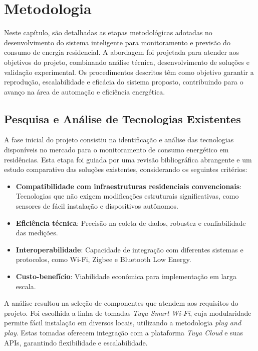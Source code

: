 \chapter{Metodologia}

Neste capítulo, são detalhadas as etapas metodológicas adotadas no desenvolvimento do sistema inteligente para monitoramento e previsão do consumo de energia residencial. A abordagem foi projetada para atender aos objetivos do projeto, combinando análise técnica, desenvolvimento de soluções e validação experimental. Os procedimentos descritos têm como objetivo garantir a reprodução, escalabilidade e eficácia do sistema proposto, contribuindo para o avanço na área de automação e eficiência energética.

\section{Pesquisa e Análise de Tecnologias Existentes}

A fase inicial do projeto consistiu na identificação e análise das tecnologias disponíveis no mercado para o monitoramento de consumo energético em residências. Esta etapa foi guiada por uma revisão bibliográfica abrangente e um estudo comparativo das soluções existentes, considerando os seguintes critérios:

\begin{itemize}
    \item \textbf{Compatibilidade com infraestruturas residenciais convencionais}: Tecnologias que não exigem modificações estruturais significativas, como sensores de fácil instalação e dispositivos autônomos.
    \item \textbf{Eficiência técnica}: Precisão na coleta de dados, robustez e confiabilidade das medições.
    \item \textbf{Interoperabilidade}: Capacidade de integração com diferentes sistemas e protocolos, como Wi-Fi, Zigbee e Bluetooth Low Energy.
    \item \textbf{Custo-benefício}: Viabilidade econômica para implementação em larga escala.
\end{itemize}

A análise resultou na seleção de componentes que atendem aos requisitos do projeto. Foi escolhida a linha de tomadas \textit{Tuya Smart Wi-Fi}, cuja modularidade permite fácil instalação em diversos locais, utilizando a metodologia \textit{plug and play}. Estas tomadas oferecem integração com a plataforma \textit{Tuya Cloud} e suas APIs, garantindo flexibilidade e escalabilidade.

